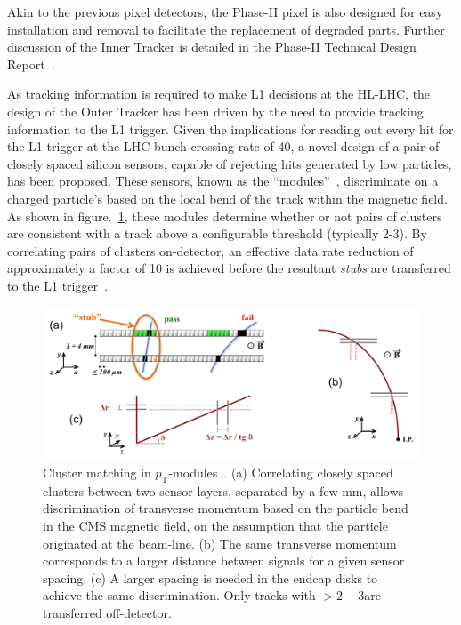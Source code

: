 Akin to the previous pixel detectors, the Phase-II pixel is also designed for easy installation and removal to facilitate the replacement of degraded parts.
Further discussion of the Inner Tracker is detailed in the Phase-II Technical Design Report~\cite{P2TrackerTDR}.

As tracking information is required to make L1 decisions at the HL-LHC, the design of the Outer Tracker has been driven by the need to provide tracking information to the L1 trigger.
Given the implications for reading out every hit for the L1 trigger at the LHC bunch crossing rate of 40\MHz, a novel design of a pair of closely spaced silicon sensors, capable of rejecting hits generated by low \pT particles, has been proposed.
These sensors, known as the ``\pT modules''~\cite{jjonespixel,markthesis}, discriminate on a charged particle's \pT based on the local bend of the track within the magnetic field.
As shown in figure.~\ref{fig:stubs}, these modules determine whether or not pairs of clusters are consistent with a track \pT above a configurable threshold (typically 2-3\GeV).
By correlating pairs of clusters on-detector, an effective data rate reduction of approximately a factor of 10 is achieved before the resultant \emph{stubs} are transferred to the L1 trigger~\cite{mpessimperf,2dptmoduleconcept}.

\begin{figure}[!t]
\centering
\includegraphics[width=5in]{figs/tk-upgrade/pTsketches.png}
\caption{Cluster matching in $p_\mathrm{T}$-modules~\cite{P2TrackerTDR}. (a) Correlating closely spaced clusters between two sensor layers, separated by a few mm, allows discrimination of transverse momentum based on the particle bend in the CMS magnetic field, on the assumption that the particle originated at the beam-line. (b) The same transverse momentum corresponds to a larger distance between signals for a given sensor spacing. (c) A larger spacing is needed in the endcap disks to achieve the same discrimination. Only tracks with \pT $> 2-3$\GeVc are transferred off-detector.
}
\label{fig:stubs}
\end{figure}

